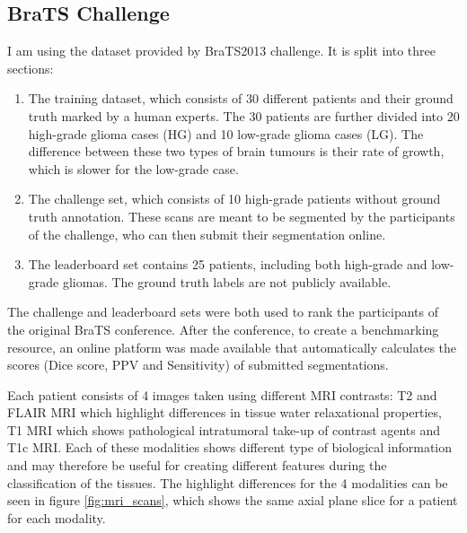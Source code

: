 \documentclass[12pt,a4paper,twoside,openright]{report}
\begin{document}
\subsection{BraTS Challenge}
I am using the dataset provided by BraTS2013 \cite{menze:hal-00935640} challenge. It is split into three sections:
\begin{enumerate}
	\item The training dataset, which consists of 30 different patients and their ground truth marked by a human experts. The 30 patients are further divided into 20 high-grade glioma cases (HG) and 10 low-grade glioma cases (LG). The difference between these two types of brain tumours is their rate  of growth, which is slower for the low-grade case.
	\item The challenge set, which consists of 10 high-grade patients without ground truth annotation. These scans are meant to be segmented by the participants of the challenge, who can then submit their segmentation online. 	
	\item The leaderboard set contains 25 patients, including both high-grade and low-grade gliomas. The ground truth labels are not publicly available.
\end{enumerate}
The challenge and leaderboard sets were both used to rank the participants of the original BraTS conference. After the conference, to create a benchmarking resource, an online platform was made available that automatically calculates the scores (Dice score, PPV and Sensitivity) of submitted segmentations.

Each patient consists of 4 images taken using different MRI contrasts: T2 and FLAIR MRI which highlight differences in tissue water relaxational properties, T1 MRI which shows pathological intratumoral take-up of contrast agents and T1c MRI. Each of these modalities shows different type of biological information and may therefore be useful for creating different features during the classification of the tissues. The highlight differences for the 4 modalities can be seen in figure \ref{fig:mri_scans}, which shows the same axial plane slice for a patient for each modality. 
\end{document}
